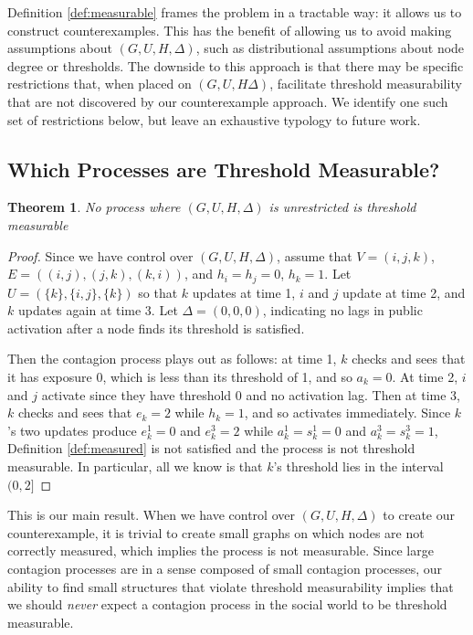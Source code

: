 \documentclass[a4paper]{article}
\newtheorem{theorem}{Theorem}
\begin{document}
Definition \ref{def:measurable} frames the problem in a tractable way: it allows us to construct counterexamples. This has the benefit of allowing us to avoid making assumptions about $(G, U, H, \Delta)$, such as distributional assumptions about node degree or thresholds. The downside to this approach is that there may be specific restrictions that, when placed on $(G, U, H \Delta)$, facilitate threshold measurability that are not discovered by our counterexample approach. We identify one such set of restrictions below, but leave an exhaustive typology to future work.

\subsection{Which Processes are Threshold Measurable?}

\begin{theorem} \label{theorem:public}
No process where $(G, U, H, \Delta)$ is unrestricted is threshold measurable
\end{theorem}

\begin{proof}
Since we have control over $(G, U, H, \Delta)$, assume that $V = (i, j, k)$, $E = ((i, j), (j, k), (k, i))$, and $h_i = h_j = 0$, $h_k = 1$. Let $U = (\{k\}, \{i, j\}, \{k\})$ so that $k$ updates at time 1, $i$ and $j$ update at time 2, and $k$ updates again at time 3. Let $\Delta = (0, 0, 0)$, indicating no lags in public activation after a node finds its threshold is satisfied.

Then the contagion process plays out as follows: at time 1, $k$ checks and sees that it has exposure 0, which is less than its threshold of 1, and so $a_k = 0$. At time 2, $i$ and $j$ activate since they have threshold 0 and no activation lag. Then at time 3, $k$ checks and sees that $e_k = 2$ while $h_k = 1$, and so activates immediately. Since $k$'s two updates produce $e_k^1 = 0$ and $e_k^3 = 2$ while $a_k^1 = s_k^1 = 0$ and $a_k^3 = s_k^3 = 1$, Definition \ref{def:measured} is not satisfied and the process is not threshold measurable. In particular, all we know is that $k$'s threshold lies in the interval $(0, 2]$

\end{proof}

\noindent
This is our main result. When we have control over $(G, U, H, \Delta)$ to create our counterexample, it is trivial to create small graphs on which nodes are not correctly measured, which implies the process is not measurable. Since large contagion processes are in a sense composed of small contagion processes, our ability to find small structures that violate threshold measurability implies that we should \emph{never} expect a contagion process in the social world to be threshold measurable.
\end{document}
